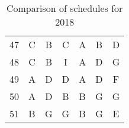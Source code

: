 \begin{table}[h]
\begin{adjustbox}{scale=0.8}
\begin{tabular}{c||ccc||ccc}
	    	                       47                         &   \cellcolor[rgb]{ 1,  .851,  .4}C    &               \cellcolor[rgb]{ .608,  .761,  .902}B                &                  \cellcolor[rgb]{ 1,  .851,  .4}C                  & \cellcolor[rgb]{ .663,  .816,  .557}A &               \cellcolor[rgb]{ .608,  .761,  .902}B                &               \cellcolor[rgb]{ .788,  .788,  .788}D                \\
	    	                       48                         &   \cellcolor[rgb]{ 1,  .851,  .4}C    &               \cellcolor[rgb]{ .608,  .761,  .902}B                & \cellcolor[rgb]{ .251,  .251,  .251}\textcolor[rgb]{ 1,  1,  1}{I} & \cellcolor[rgb]{ .663,  .816,  .557}A &               \cellcolor[rgb]{ .788,  .788,  .788}D                &                \cellcolor[rgb]{ .518,  .592,  .69}G                \\
	    	                       49                         & \cellcolor[rgb]{ .663,  .816,  .557}A &               \cellcolor[rgb]{ .788,  .788,  .788}D                &               \cellcolor[rgb]{ .788,  .788,  .788}D                & \cellcolor[rgb]{ .663,  .816,  .557}A &               \cellcolor[rgb]{ .788,  .788,  .788}D                &               \cellcolor[rgb]{ .557,  .663,  .859}F                \\
	    	                       50                         & \cellcolor[rgb]{ .663,  .816,  .557}A &               \cellcolor[rgb]{ .788,  .788,  .788}D                &               \cellcolor[rgb]{ .608,  .761,  .902}B                & \cellcolor[rgb]{ .608,  .761,  .902}B &                \cellcolor[rgb]{ .518,  .592,  .69}G                &                \cellcolor[rgb]{ .518,  .592,  .69}G                \\
	    	                       51                         & \cellcolor[rgb]{ .608,  .761,  .902}B &                \cellcolor[rgb]{ .518,  .592,  .69}G                &                \cellcolor[rgb]{ .518,  .592,  .69}G                & \cellcolor[rgb]{ .608,  .761,  .902}B &                \cellcolor[rgb]{ .518,  .592,  .69}G                &                \cellcolor[rgb]{ .957,  .69,  .518}E
	    \end{tabular}%
	\end{adjustbox}
	\caption{Comparison of schedules for 2018}
	\label{tbl:2018-schedule-comparison}%
\end{table}%

